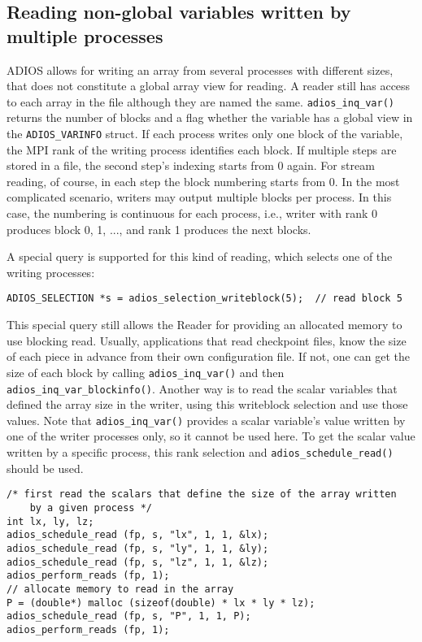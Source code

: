 \subsection{Reading non-global variables written by multiple processes}
\label {section:non_global_vars}
ADIOS allows for writing an array from several processes with different sizes, that does not constitute a global array view for reading. A reader still has access to each array in the file although they are named the same. \verb+adios_inq_var()+ returns the number of blocks and a flag whether the variable has a global view in the \verb+ADIOS_VARINFO+ struct. If each process writes only one block of the variable, the MPI rank of the writing process identifies each block.  If multiple steps are stored in a file, the second step's indexing starts from 0 again. For stream reading, of course, in each step the block numbering starts from 0. In the most complicated scenario, writers may output multiple blocks per process. In this case, the numbering is continuous for each process, i.e., writer with rank 0 produces block 0, 1, ..., and rank 1 produces the next blocks. 

 A special query is supported for this kind of reading, which selects one of the writing processes:

\begin{lstlisting}[frame=none]
ADIOS_SELECTION *s = adios_selection_writeblock(5);  // read block 5 
\end{lstlisting}
 
This special query still allows the Reader for providing an allocated memory to use blocking read. Usually, applications that read checkpoint files, know the size of each piece in advance from their own configuration file. If not, one can get the size of each block by calling \verb+adios_inq_var()+ and then \verb+adios_inq_var_blockinfo()+. Another way is to read the scalar variables that defined the array size in the writer, using this writeblock selection and use those values. Note that \verb+adios_inq_var()+ provides a scalar variable's value written by one of the writer processes only, so it cannot be used here. To get the scalar value written by a specific process, this rank selection and \verb+adios_schedule_read()+ should be used.

\begin{lstlisting}[numbers=none, 
                             caption={Read an array written by one specific process, with first reading the scalars that define the size of the array},  label=code:localread]
/* first read the scalars that define the size of the array written
    by a given process */
int lx, ly, lz;
adios_schedule_read (fp, s, "lx", 1, 1, &lx);
adios_schedule_read (fp, s, "ly", 1, 1, &ly);
adios_schedule_read (fp, s, "lz", 1, 1, &lz);
adios_perform_reads (fp, 1); 
// allocate memory to read in the array
P = (double*) malloc (sizeof(double) * lx * ly * lz);
adios_schedule_read (fp, s, "P", 1, 1, P);
adios_perform_reads (fp, 1);  
\end{lstlisting}



